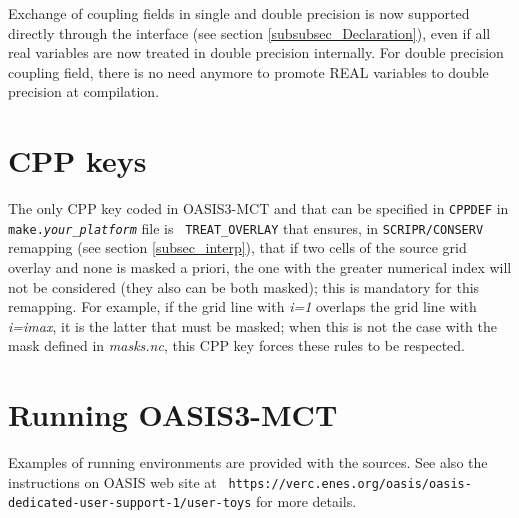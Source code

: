 Exchange of coupling fields in single and double precision is now supported directly through the interface 
(see section \ref{subsubsec_Declaration}), even if all real variables are now treated in double precision internally.
For double precision coupling field, there is no need anymore to promote REAL variables to double precision at compilation.

\section{CPP keys}
\label{subsec_cpp}

The only CPP key coded in OASIS3-MCT and that can be specified in
{\tt CPPDEF} in {\tt make.{\it your\_platform}} file is {\tt
  TREAT\_OVERLAY} that ensures, in {\tt SCRIPR/CONSERV}
  remapping (see section \ref{subsec_interp}), that if two cells of
  the source grid overlay and none is masked a priori, the one with the greater numerical
  index will not be considered (they also can be both masked); this is mandatory
  for this remapping. For example, if the grid line with {\it i=1} overlaps
  the grid line with {\it i=imax}, it is the latter that must be masked;
  when this is not the case with the mask defined in {\it masks.nc},
  this CPP key forces these rules to be respected.


\section{Running OASIS3-MCT}
\label{subsec_running}

Examples of running environments are provided with the sources. See also the instructions on OASIS web site at
{\tt
  https://verc.enes.org/oasis/oasis-dedicated-user-support-1/user-toys}
for more details.

